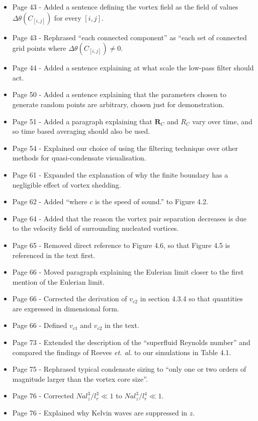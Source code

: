 \documentclass{article}
\begin{document}
\begin{itemize}
\item Page 43 - Added a sentence defining the vortex field as the field of values $\Delta\theta(C_{[i,j]})$ for every $[i,j]$.
\item Page 43 - Rephrased ``each connected component'' as ``each set of connected grid points where $\Delta\theta(C_{[i,j]})\neq 0$.
\item Page 44 - Added a sentence explaining at what scale the low-pass filter should act.
\item Page 50 - Added a sentence explaining that the parameters chosen to generate random points are arbitrary, chosen just for demonstration.
\item Page 51 - Added a paragraph explaining that $\mathbf{R}_C$ and $R_C$ vary over time, and so time based averaging should also be used.
\item Page 54 - Explained our choice of using the filtering technique over other methods for quasi-condensate visualisation.
\item Page 61 - Expanded the explanation of why the finite boundary has a negligible effect of vortex shedding.
\item Page 62 - Added ``where $c$ is the speed of sound.'' to Figure 4.2.
\item Page 64 - Added that the reason the vortex pair separation decreases is due to the velocity field of surrounding nucleated vortices.
\item Page 65 - Removed direct reference to Figure 4.6, so that Figure 4.5 is referenced in the text first.
\item Page 66 - Moved paragraph explaining the Eulerian limit closer to the first mention of the Eulerian limit.
\item Page 66 - Corrected the derivation of $v_{c2}$ in section 4.3.4 so that quantities are expressed in dimensional form.
\item Page 66 - Defined $v_{c1}$ and $v_{c2}$ in the text.
\item Page 73 - Extended the description of the ``superfluid Reynolds number'' and compared the findings of Reeves {\it et. al.} to our simulations in Table 4.1.
\item Page 75 - Rephrased typical condensate sizing to ``only one or two orders of magnitude larger than the vortex core size''.
\item Page 76 - Corrected $N a l_z^3/l_r^3 \ll 1$ to $N a l_z^3/l_r^4 \ll 1$.
\item Page 76 - Explained why Kelvin waves are suppressed in $z$.

\end{itemize}
\end{document}
